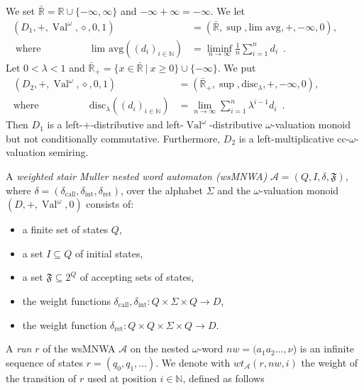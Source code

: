 \documentclass[runningheads, envcountsame, a4paper]{llncs}
\DeclareMathOperator{\Val}{Val}
\DeclareMathOperator{\call}{call}
\DeclareMathOperator{\ret}{ret}
\begin{document}
\begin{example}[\cite{DM}] We set $\bar{\mathbb{R}}=\mathbb{R} \cup \{-\infty, \infty\}$ and $-\infty +\infty = -\infty$. We let \begin{align*}
	 (D_1,+,\Val^\omega, \diamond,0,1)&=(\bar{\mathbb{R}},\sup,\text{lim avg},+,-\infty,0), \\
	\text{ where } \hspace{2cm}	 \text{lim avg}((d_i)_{i \in \mathbb{N}})&=\liminf_{n \rightarrow \infty}\frac{1}{n}\sum_{i=1}^{n}d_i\enspace. \hspace{3cm}
\end{align*}
Let $0 < \lambda < 1$ and $\bar{\mathbb{R}}_{+}=\{x\in \bar{\mathbb{R}}~|~x \ge 0\} \cup \{-\infty\}$. We put \begin{align*}
(D_2,+,\Val^\omega, \diamond,0,1)&=(\bar{\mathbb{R}}_{+},\sup,\mathrm{disc}_\lambda,+,-\infty,0), \\
	\text{where } \hspace{2cm} \mathrm{disc}_\lambda((d_i)_{i \in \mathbb{N}})&=\lim_{n \rightarrow \infty}\sum_{i=1}^{n}\lambda^{i-1}d_i\enspace. \hspace{3cm}
\end{align*}
Then $D_1$ is a left-$+$-distributive and left-$\Val^\omega$-distributive $\omega$-valuation monoid but not conditionally commutative. Furthermore, $D_2$ is a left-multiplicative cc-$\omega$-valuation semiring. 
\end{example}
\begin{Def} \label{defwsMNWA}
	A \emph{weighted stair Muller nested word automaton (wsMNWA)} $\mathcal{A}=(Q,I,\delta,\mathfrak{F})$, where $\delta=(\delta_{\call},\delta_{\mathrm{int}},\delta_{\ret})$, over the alphabet $\Sigma$ and the $\omega$-valuation monoid $(D,+,\Val^\omega,0)$ consists of:
	\begin{itemize}
		\item a finite set of states $Q$,
		\item a set $I \subseteq Q$ of initial states,
		\item a set $\mathfrak{F} \subseteq 2^Q$ of accepting sets of states,
		\item the weight functions $\delta_{\call},\delta_{\mathrm{int}}:Q \times \Sigma \times Q \rightarrow D$,
 		\item the weight function $\delta_{\ret}:Q \times Q \times \Sigma \times Q \rightarrow D$.
	\end{itemize}
\end{Def}
A \emph{run} $r$ of the wsMNWA $\mathcal{A}$ on the nested $\omega$-word $\mathit{nw}=(a_1a_2...,\nu$) is an infinite sequence of states $r=(q_0,q_1,...)$. We denote with $\mathit{wt}_\mathcal{A}(r,\mathit{nw},i)$ the weight of the transition of $r$ used at position $i \in \mathbb{N}$, defined as follows
\end{document}
